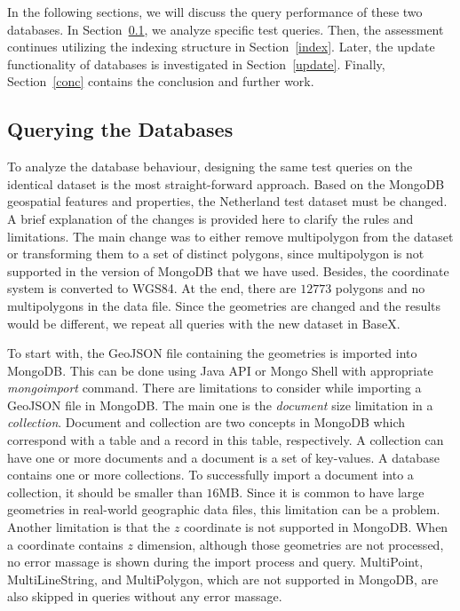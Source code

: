 \documentclass[a4paper,12pt]{article}
\begin{document}
In the following sections, we will discuss the query performance of these two databases. 
In Section~\ref{s.query}, we analyze specific test queries. Then, the assessment continues
utilizing the indexing structure in Section~\ref{index}. Later, the update functionality of databases is 
investigated in Section~\ref{update}. Finally, Section~\ref{conc} contains the conclusion and further work.

\subsection{Querying the Databases}
\label{s.query}
To analyze the database behaviour, designing the same test queries on the identical dataset is the most straight-forward approach. Based on the MongoDB geospatial features and properties, the Netherland test dataset must be changed. A brief explanation of the changes is provided here to clarify the rules and limitations. The main change was to either remove multipolygon from the dataset or transforming them to a set of distinct polygons, since multipolygon is not supported in the version of MongoDB that we have used. Besides, the coordinate system is converted to WGS84. At the end, there are $12773$ polygons and no multipolygons in the data file. Since the geometries are changed and the results would be different, we repeat all queries with the new dataset in BaseX.

To start with, the GeoJSON file containing the geometries is imported into MongoDB. This can be done  using Java API or Mongo Shell with appropriate \textit{mongoimport} command. There are limitations to consider while importing a GeoJSON file in MongoDB. The main one is the \textit{document} size limitation in a \textit{collection}. Document and collection are two concepts in MongoDB which correspond with a table and a record in this table, respectively. A collection can have one or more documents and a document is a set of key-values. A database contains one or more collections. To successfully import a document into a collection, it should be smaller than $16$MB. Since it is common to have large geometries in real-world geographic data files, this limitation can be a problem. Another limitation is that the $z$ coordinate is not supported in MongoDB. When a coordinate contains $z$ dimension, although those geometries are not processed, no error massage is shown during the import process and query. MultiPoint, MultiLineString, and MultiPolygon, which are not supported in MongoDB, are also skipped in queries without any error massage. 
\end{document}
